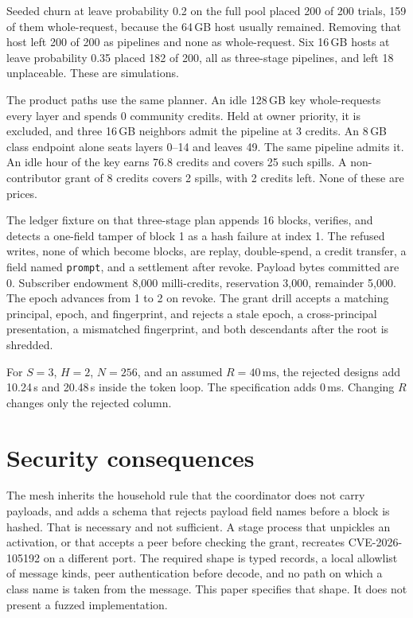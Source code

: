 \documentclass[11pt]{article}
\begin{document}
Seeded churn at leave probability 0.2 on the full pool placed 200 of 200 trials, 159 of them whole-request, because the 64\,GB host usually remained. Removing that host left 200 of 200 as pipelines and none as whole-request. Six 16\,GB hosts at leave probability 0.35 placed 182 of 200, all as three-stage pipelines, and left 18 unplaceable. These are simulations.

The product paths use the same planner. An idle 128\,GB key whole-requests every layer and spends 0 community credits. Held at owner priority, it is excluded, and three 16\,GB neighbors admit the pipeline at 3 credits. An 8\,GB class endpoint alone seats layers 0--14 and leaves 49. The same pipeline admits it. An idle hour of the key earns 76.8 credits and covers 25 such spills. A non-contributor grant of 8 credits covers 2 spills, with 2 credits left. None of these are prices.

The ledger fixture on that three-stage plan appends 16 blocks, verifies, and detects a one-field tamper of block 1 as a hash failure at index 1. The refused writes, none of which become blocks, are replay, double-spend, a credit transfer, a field named \texttt{prompt}, and a settlement after revoke. Payload bytes committed are 0. Subscriber endowment 8{,}000 milli-credits, reservation 3{,}000, remainder 5{,}000. The epoch advances from 1 to 2 on revoke. The grant drill accepts a matching principal, epoch, and fingerprint, and rejects a stale epoch, a cross-principal presentation, a mismatched fingerprint, and both descendants after the root is shredded.

For \(S=3\), \(H=2\), \(N=256\), and an assumed \(R=40\,\mathrm{ms}\), the rejected designs add 10.24\,s and 20.48\,s inside the token loop. The specification adds 0\,ms. Changing \(R\) changes only the rejected column.

\section{Security consequences}
The mesh inherits the household rule that the coordinator does not carry payloads, and adds a schema that rejects payload field names before a block is hashed. That is necessary and not sufficient. A stage process that unpickles an activation, or that accepts a peer before checking the grant, recreates CVE-2026-105192 on a different port. The required shape is typed records, a local allowlist of message kinds, peer authentication before decode, and no path on which a class name is taken from the message. This paper specifies that shape. It does not present a fuzzed implementation.
\end{document}
